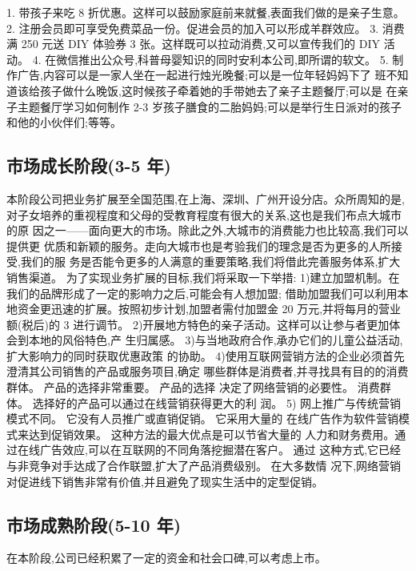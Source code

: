 1. 带孩子来吃 8 折优惠。这样可以鼓励家庭前来就餐,表面我们做的是亲子生意。
2. 注册会员即可享受免费菜品一份。促进会员的加入可以形成羊群效应。
3. 消费满 250 元送 DIY 体验券 3 张。这样既可以拉动消费,又可以宣传我们的 DIY
活动。
4. 在微信推出公众号,科普母婴知识的同时安利本公司,即所谓的软文。
5. 制作广告,内容可以是一家人坐在一起进行烛光晚餐;可以是一位年轻妈妈下了
班不知道该给孩子做什么晚饭,这时候孩子牵着她的手带她去了亲子主题餐厅;可以是
在亲子主题餐厅学习如何制作 2-3 岁孩子膳食的二胎妈妈;可以是举行生日派对的孩子
和他的小伙伴们;等等。

\subsection{市场成长阶段(3-5 年)}
本阶段公司把业务扩展至全国范围,在上海、深圳、广州开设分店。众所周知的是,
对子女培养的重视程度和父母的受教育程度有很大的关系,这也是我们布点大城市的原
因之一——面向更大的市场。除此之外,大城市的消费能力也比较高,我们可以提供更
优质和新颖的服务。走向大城市也是考验我们的理念是否为更多的人所接受,我们的服
务是否能令更多的人满意的重要策略,我们将借此完善服务体系,扩大销售渠道。
为了实现业务扩展的目标,我们将采取一下举措:
1)建立加盟机制。在我们的品牌形成了一定的影响力之后,可能会有人想加盟;
借助加盟我们可以利用本地资金更迅速的扩展。按照初步计划,加盟者需付加盟金 20
万元,并将每月的营业额(税后)的 3%
进行调节。
2)开展地方特色的亲子活动。这样可以让参与者更加体会到本地的风俗特色,产
生归属感。
3)与当地政府合作,承办它们的儿童公益活动,扩大影响力的同时获取优惠政策
的协助。
4)使用互联网营销方法的企业必须首先澄清其公司销售的产品或服务项目,确定
哪些群体是消费者,并寻找具有目的的消费群体。 产品的选择非常重要。 产品的选择
决定了网络营销的必要性。 消费群体。 选择好的产品可以通过在线营销获得更大的利
润。
5) 网上推广与传统营销模式不同。 它没有人员推广或直销促销。 它采用大量的
在线广告作为软件营销模式来达到促销效果。 这种方法的最大优点是可以节省大量的
人力和财务费用。通过在线广告效应,可以在互联网的不同角落挖掘潜在客户。 通过
这种方式,它已经与非竞争对手达成了合作联盟,扩大了产品消费级别。 在大多数情
况下,网络营销对促进线下销售非常有价值,并且避免了现实生活中的定型促销。
\subsection{市场成熟阶段(5-10 年)}
在本阶段,公司已经积累了一定的资金和社会口碑,可以考虑上市。
